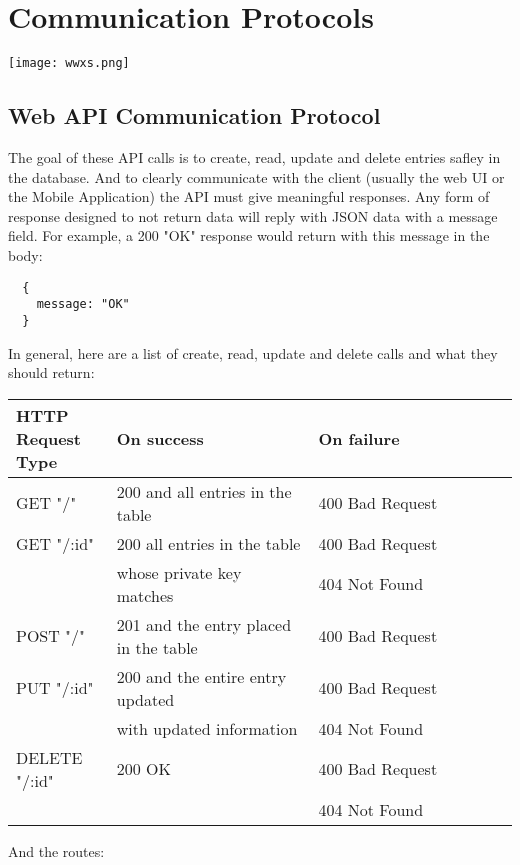 \section{Communication Protocols}
\texttt{[image: wwxs.png]}
\subsection{Web API Communication Protocol}
The goal of these API calls is to create, read, update and delete entries safley in the database. And to clearly communicate with the client (usually the web UI or the Mobile Application) the API must give meaningful responses. Any form of response designed to not return data will reply with JSON data with a message field. For example, a 200 "OK" response would return with this message in the body:
\begin{lstlisting}
  {
    message: "OK"
  }
\end{lstlisting}
In general, here are a list of create, read, update and delete calls and what they should return:
\begin{center}
  \begin{tabular}{| p{0.2\linewidth} | p{0.4\linewidth}  | p{0.4\linewidth} |}
    \hline
    HTTP Request Type & On success & On failure \\
    \hline
    GET "/" & 200 and all entries in the table & 400 Bad Request \\
    \hline
    GET "/:id" & 200 all entries in the table & 400 Bad Request \\
    & whose private key matches & 404 Not Found \\
    \hline
    POST "/" & 201 and the entry placed in the table & 400 Bad Request \\
    \hline
    PUT "/:id" & 200 and the entire entry updated & 400 Bad Request \\
    & with updated information & 404 Not Found \\
    \hline
    DELETE "/:id" & 200 OK & 400 Bad Request \\
    & & 404 Not Found \\
    \hline
  \end{tabular}
\end{center}
And the routes:
